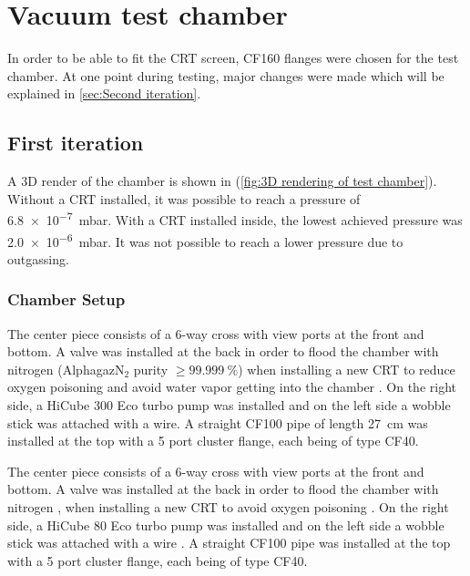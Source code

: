 
\chapter{Vacuum test chamber}
\label{ch:Vacuum chamber}

In order to be able to fit the CRT screen, CF160 flanges were chosen for the test chamber. At one point during testing, major changes were made which will be explained in \cref{sec:Second iteration}.

\section{First iteration}
\label{sec:vacuum chamber first iteration}

A 3D render of the chamber is shown in  (\cref{fig:3D rendering of test chamber}). Without a CRT installed, it was possible to reach a pressure of \SI{6.8e-7}{\milli\bar}. With a CRT installed inside, the lowest achieved pressure was \SI{2.0e-6}{\milli\bar}. It was not possible to reach a lower pressure due to outgassing.

 
\subsection{Chamber Setup}
\label{subsec:Chamber Setup}
 
The center piece consists of a 6-way cross with view ports at the front and bottom. A valve was installed at the back in order to flood the chamber with nitrogen  (Alphagaz\texttrademark  N$_2$ purity $\ge\SI{99.999}{\percent}$) when installing a new CRT to reduce oxygen poisoning and avoid water vapor getting into the chamber . On the right side, a HiCube 300 Eco turbo pump was installed and on the left side a wobble stick was attached with a wire. A straight CF100 pipe of length \SI{27}{\centi\meter} was installed at the top with a 5 port cluster flange, each being of type CF40. 

The center piece consists of a 6-way cross with view ports at the front and bottom. A valve was installed at the back in order to flood the chamber with nitrogen , when installing a new CRT to avoid oxygen poisoning . On the right side, a HiCube 80 Eco turbo pump was installed and on the left side a wobble stick was attached with a wire . A straight CF100 pipe  was installed at the top with a 5 port cluster flange, each being of type CF40.
 
